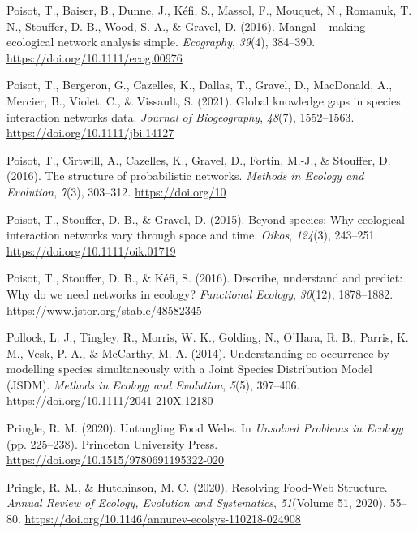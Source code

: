 \documentclass[
]{article}
\newlength{\cslhangindent}
\newenvironment{CSLReferences}[2] %
 {\begin{list}{}{%
  \setlength{\itemindent}{0pt}
  \setlength{\leftmargin}{0pt}
  \setlength{\parsep}{0pt}
  \ifodd #1
   \setlength{\leftmargin}{\cslhangindent}
   \setlength{\itemindent}{-1\cslhangindent}
  \fi
  \setlength{\itemsep}{#2\baselineskip}}}
 {\end{list}}
\begin{document}
\begin{CSLReferences}{1}{0}
Poisot, T., Baiser, B., Dunne, J., Kéfi, S., Massol, F., Mouquet, N.,
Romanuk, T. N., Stouffer, D. B., Wood, S. A., \& Gravel, D. (2016).
Mangal -- making ecological network analysis simple. \emph{Ecography},
\emph{39}(4), 384--390. \url{https://doi.org/10.1111/ecog.00976}

Poisot, T., Bergeron, G., Cazelles, K., Dallas, T., Gravel, D.,
MacDonald, A., Mercier, B., Violet, C., \& Vissault, S. (2021). Global
knowledge gaps in species interaction networks data. \emph{Journal of
Biogeography}, \emph{48}(7), 1552--1563.
\url{https://doi.org/10.1111/jbi.14127}

Poisot, T., Cirtwill, A., Cazelles, K., Gravel, D., Fortin, M.-J., \&
Stouffer, D. (2016). The structure of probabilistic networks.
\emph{Methods in Ecology and Evolution}, \emph{7}(3), 303--312.
\url{https://doi.org/10}

Poisot, T., Stouffer, D. B., \& Gravel, D. (2015). Beyond species: Why
ecological interaction networks vary through space and time.
\emph{Oikos}, \emph{124}(3), 243--251.
\url{https://doi.org/10.1111/oik.01719}

Poisot, T., Stouffer, D. B., \& Kéfi, S. (2016). Describe, understand
and predict: Why do we need networks in ecology? \emph{Functional
Ecology}, \emph{30}(12), 1878--1882.
\url{https://www.jstor.org/stable/48582345}

Pollock, L. J., Tingley, R., Morris, W. K., Golding, N., O'Hara, R. B.,
Parris, K. M., Vesk, P. A., \& McCarthy, M. A. (2014). Understanding
co-occurrence by modelling species simultaneously with a {Joint Species
Distribution Model} ({JSDM}). \emph{Methods in Ecology and Evolution},
\emph{5}(5), 397--406. \url{https://doi.org/10.1111/2041-210X.12180}

Pringle, R. M. (2020). Untangling {Food Webs}. In \emph{Unsolved
{Problems} in {Ecology}} (pp. 225--238). Princeton University Press.
\url{https://doi.org/10.1515/9780691195322-020}

Pringle, R. M., \& Hutchinson, M. C. (2020). Resolving {Food-Web
Structure}. \emph{Annual Review of Ecology, Evolution and Systematics},
\emph{51}(Volume 51, 2020), 55--80.
\url{https://doi.org/10.1146/annurev-ecolsys-110218-024908}


\end{CSLReferences}
\end{document}
